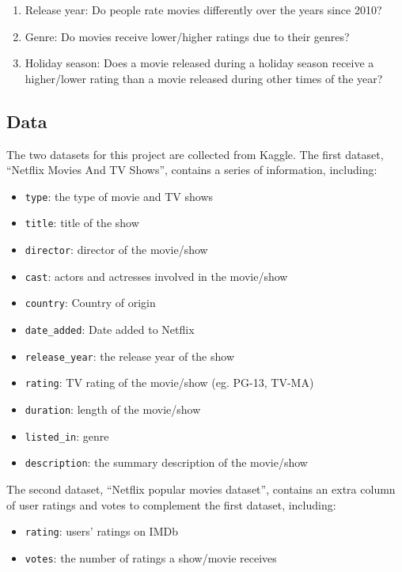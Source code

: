 \documentclass[
]{article}
\providecommand{\tightlist}{%
  \setlength{\itemsep}{0pt}\setlength{\parskip}{0pt}}
\begin{document}
\begin{enumerate}
\def\labelenumi{\arabic{enumi}.}
\tightlist
\item
  Release year: Do people rate movies differently over the years since
  2010?
\item
  Genre: Do movies receive lower/higher ratings due to their genres?
\item
  Holiday season: Does a movie released during a holiday season receive
  a higher/lower rating than a movie released during other times of the
  year?
\end{enumerate}

\hypertarget{data}{%
\subsection{Data}\label{data}}

The two datasets for this project are collected from Kaggle. The first
dataset, ``Netflix Movies And TV Shows'', contains a series of
information, including:

\begin{itemize}
\tightlist
\item
  \texttt{type}: the type of movie and TV shows
\item
  \texttt{title}: title of the show
\item
  \texttt{director}: director of the movie/show
\item
  \texttt{cast}: actors and actresses involved in the movie/show
\item
  \texttt{country}: Country of origin
\item
  \texttt{date\_added}: Date added to Netflix
\item
  \texttt{release\_year}: the release year of the show
\item
  \texttt{rating}: TV rating of the movie/show (eg. PG-13, TV-MA)
\item
  \texttt{duration}: length of the movie/show
\item
  \texttt{listed\_in}: genre
\item
  \texttt{description}: the summary description of the movie/show
\end{itemize}

The second dataset, ``Netflix popular movies dataset'', contains an
extra column of user ratings and votes to complement the first dataset,
including:

\begin{itemize}
\tightlist
\item
  \texttt{rating}: users' ratings on IMDb
\item
  \texttt{votes}: the number of ratings a show/movie receives
\end{itemize}
\end{document}
